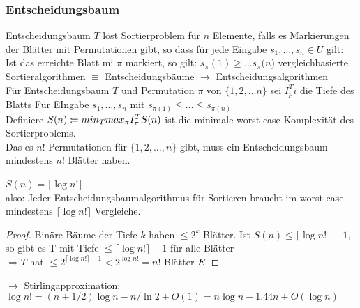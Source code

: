 \subsubsection{Entscheidungsbaum}
Entscheidungsbaum $T$ löst Sortierproblem für $n$ Elemente, falls es 
Markierungen der Blätter mit Permutationen gibt, so dass für jede Eingabe $s_1,\ldots,s_n \in U$ gilt:
Ist das erreichte Blatt mi $\pi$ markiert, so gilt: $s_\pi(1) \geq \ldots s_\pi(n$)
vergleichbasierte Sortieralgorithmen $\equiv$  Entscheidungsbäume $\to$ Entscheidungsalgorithmen\\
Für Entscheidungsbaum $T$ und Permutation $\pi$ von $\{1,2,\ldots n\}$ sei $I^T_pi$ die Tiefe des Blatts Für EIngabe $s_1,\ldots,s_n$ mit $s_{\pi(1)} \leq \ldots \leq s_{\pi(n)}$\\
Definiere $S(n) :\!= min_T max_\pi I^T_\pi\\
S(n)$ ist die minimale worst-case Komplexität des Sortierproblems.\\
Das es $n!$ Permutationen für $\{ 1,2,\ldots,n \}$ gibt, muss ein Entscheidungsbaum mindestens $n!$ Blätter haben.\\
\begin{satz}
$S(n)  = \lceil \log n! \rceil$.\\
also: Jeder Entscheidungsbaumalgorithmus für Sortieren braucht im worst case mindestens $\lceil \log n! \rceil$ Vergleiche.
\end{satz}
\begin{proof}
Binäre Bäume der Tiefe $k$ haben $\leq 2^k$ Blätter. Ist $S(n) \leq \lceil \log n! \rceil - 1$, so gibt es T mit Tiefe $\leq \lceil \log n! \rceil -1 $ für alle Blätter\\
$\Rightarrow T$ hat $\leq 2^{\lceil \log n! \rceil -1} < 2^{\log n!} = n!$ Blätter
$\Lightning$
\end{proof}
$\to$ Stirlingapproximation:\\
$\log n! = (n + 1/2)\log n -n/\ln 2 + O(1) = n \log n -1.44 n + O(\log n)$

